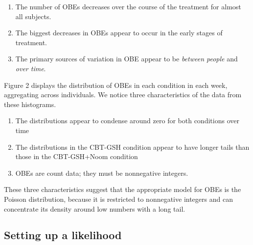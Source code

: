 \documentclass{article}
\begin{document}
\begin{enumerate}
\item{The number of OBEs decreases over the course of the treatment for almost all subjects.}
\item{The biggest decreases in OBEs appear to occur in the early stages of treatment.}
\item{The primary sources of variation in OBE appear to be \emph{between people} and \emph{over time}.}
\end{enumerate}
%
%

Figure 2 displays the distribution of OBEs in each condition in each week, aggregating across individuals.  We notice three characteristics of the data from these histograms.
\begin{enumerate}
\item{The distributions appear to condense around zero for both conditions over time} 
\item{The distributions in the CBT-GSH condition appear to have longer tails than those in the CBT-GSH+Noom condition}
\item{OBEs are count data; they must be nonnegative integers.}
\end{enumerate}
These three characteristics suggest that the appropriate model for OBEs is the Poisson distribution, because it is restricted to nonnegative integers and can concentrate its density around low numbers with a long tail.
%
%
\subsection*{Setting up a likelihood}
\end{document}

